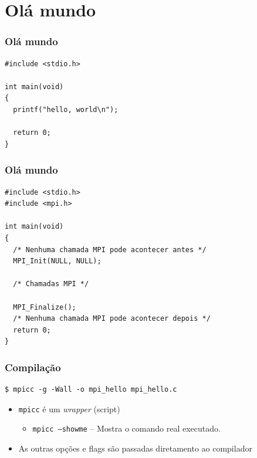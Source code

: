 \documentclass[xcolor={usenames,dvipsnames},12pt,presentation,aspectratio=169]{beamer}
\begin{document}
\section{Olá mundo}
\begin{frame}[fragile]
  \frametitle{Olá mundo}
  
  \begin{center}
\begin{minipage}{0.9\textwidth}
  \begin{verbatim}
#include <stdio.h>

int main(void)
{
  printf("hello, world\n");

  return 0;
}
  \end{verbatim}
\end{minipage}
\end{center}
\end{frame}
\begin{frame}[fragile]
  \frametitle{Olá mundo}
  
\begin{center}
\begin{minipage}{0.9\textwidth}
  \begin{verbatim}
#include <stdio.h>
#include <mpi.h>

int main(void)
{
  /* Nenhuma chamada MPI pode acontecer antes */
  MPI_Init(NULL, NULL);

  /* Chamadas MPI */

  MPI_Finalize();
  /* Nenhuma chamada MPI pode acontecer depois */
  return 0;
}
  \end{verbatim}
\end{minipage}
\end{center}
\end{frame}
\begin{frame}[fragile]
  \frametitle{Compilação}
  \begin{center}  
  \begin{minipage}{0.9\textwidth}
    \begin{verbatim}
$ mpicc -g -Wall -o mpi_hello mpi_hello.c
    \end{verbatim}
  \end{minipage}
  \end{center}
%
\begin{itemize}
  \item \texttt{mpicc} é um \emph{wrapper} (script)
  \begin{itemize}
    \item \texttt{mpicc --showme} -- Mostra o comando real executado.
  \end{itemize}
  \item As outras opções e flags são passadas diretamento ao compilador
\end{itemize}
\end{frame}
\end{document}
